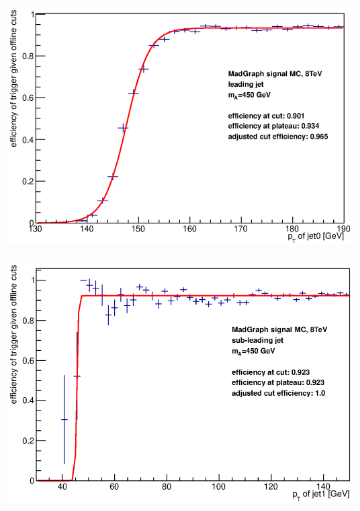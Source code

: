 \begin{figure}[phtb!]
\begin{center}
  \begin{subfigure}[leading jet, $m_{A}=450$ GeV]{0.4\textwidth}\includegraphics[width=\textwidth]{Systematics/images/jet0_trigger_turn_on_bAbb_450_j35.eps}\end{subfigure}
  \begin{subfigure}[sub-leading jet, $m_{A}=450$ GeV]{0.4\textwidth}\includegraphics[width=\textwidth]{Systematics/images/jet1_trigger_turn_on_bAbb_450_j35.eps}\end{subfigure}

\end{center}
\end{figure}
